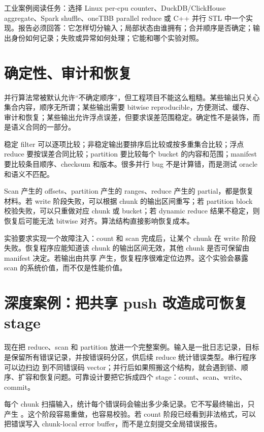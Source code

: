 \begin{sourcereadingbox}
工业案例阅读任务：选择 Linux per-cpu counter、DuckDB/ClickHouse aggregate、Spark shuffle、oneTBB parallel reduce 或 C++ 并行 STL 中一个实现。报告必须回答：它怎样切分输入；局部状态由谁拥有；合并顺序是否确定；输出身份如何记录；失败或异常如何处理；它能和哪个实验对照。
\end{sourcereadingbox}

\section{确定性、审计和恢复}

并行算法常被默认允许“不确定顺序”，但工程项目不能这么粗糙。某些输出只关心集合内容，顺序无所谓；某些输出需要 bitwise reproducible，方便测试、缓存、审计和恢复；某些输出允许浮点误差，但要求误差范围稳定。确定性不是装饰，而是语义合同的一部分。

稳定 filter 可以逐项比较；非稳定输出要排序后比较或按多重集合比较；浮点 reduce 要按误差合同比较；partition 要比较每个 bucket 的内容和范围；manifest 要比较条目顺序、checksum 和版本。很多并行 bug 不是计算错，而是测试 oracle 和语义不匹配。

Scan 产生的 offsets、partition 产生的 ranges、reduce 产生的 partial，都是恢复材料。若 write 阶段失败，可以根据 chunk 的输出区间重写；若 partition block 校验失败，可以只重做对应 chunk 或 bucket；若 dynamic reduce 结果不稳定，则恢复后可能无法 bitwise 对齐。算法结构直接影响恢复成本。

实验要求实现一个故障注入：count 和 scan 完成后，让某个 chunk 在 write 阶段失败。恢复程序应能知道该 chunk 的输出区间无效，其他 chunk 是否可保留由 manifest 决定。若输出由共享  产生，恢复程序很难定位边界。这个实验会暴露 scan 的系统价值，而不仅是性能价值。

\section{深度案例：把共享 push 改造成可恢复 stage}

现在把 reduce、scan 和 partition 放进一个完整案例。输入是一批日志记录，目标是保留所有错误记录，并按错误码分区，供后续 reduce 统计错误类型。串行程序可以边扫边  到不同错误码 vector；并行后如果照搬这个结构，就会遇到锁、顺序、扩容和恢复问题。可靠设计要把它拆成四个 stage：count、scan、write、commit。

每个 chunk 扫描输入，统计每个错误码会输出多少条记录。它不写最终输出，只产生 。这个阶段容易重做，也容易校验。若 count 阶段已经看到非法格式，可以把错误写入 chunk-local error buffer，而不是立刻提交全局错误报告。

